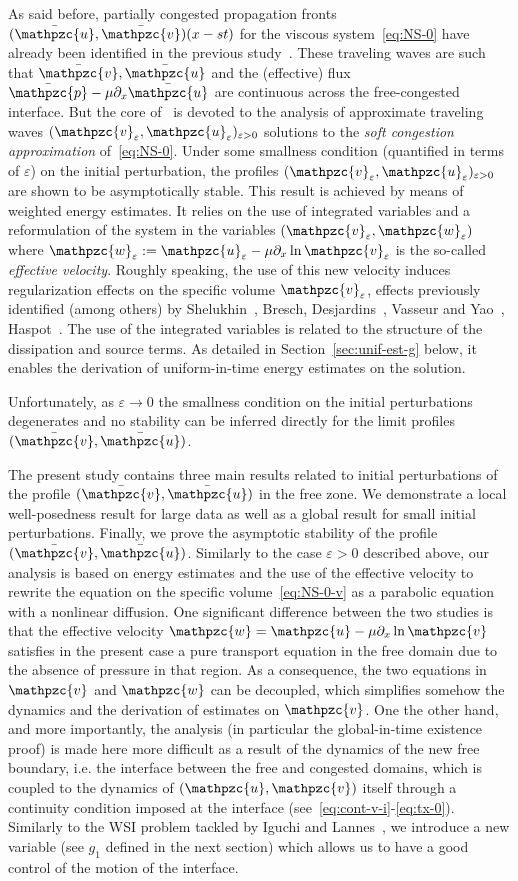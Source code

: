 \documentclass[AHL,Unicode,longabstracts,published]{cedram}
\newcommand{\ep}{\varepsilon}
\newcommand{\p}{\partial}
\newcommand{\bv}{\bar{\mathpzc{v}}}
\newcommand{\bu}{\bar{\mathpzc{u}}}
\newcommand{\bp}{\bar{\mathpzc{p}}}
\newcommand{\tv}{\mathpzc{v}}
\newcommand{\tu}{\mathpzc{u}}
\newcommand{\tw}{\mathpzc{w}}
\begin{document}
As said before, partially congested propagation fronts $(\bu, \bv)(x-st)$ for the viscous system~\eqref{eq:NS-0} have already been identified in the previous study~\cite{DP}. These traveling waves are such that $\bv, \bu$ and the (effective) flux $\bp-\mu\partial_x \bu$ are continuous across the free-congested interface. But the core of~\cite{DP} is devoted to the analysis of approximate traveling waves $(\tv_\ep,\tu_\ep)_{\ep> 0}$ solutions to the \emph{soft congestion approximation} of~\eqref{eq:NS-0}. Under some smallness condition (quantified in terms of $\ep$) on the initial perturbation, the profiles $(\tv_\ep,\tu_\ep)_{\ep> 0}$ are shown to be asymptotically stable. This result is achieved by means of weighted energy estimates. It relies on the use of integrated variables and a reformulation of the system in the variables $(\tv_\ep,\tw_\ep)$ where $\tw_\ep:= \tu_\ep -\mu \partial_x \ln\tv_\ep$ is the so-called \emph{effective velocity}. Roughly speaking, the use of this new velocity induces regularization effects on the specific volume $\tv_\ep$, effects previously identified (among others) by Shelukhin~\cite{shelukhin1984}, Bresch, Desjardins~\cite{bresch2006}, Vasseur and Yao~\cite{vasseur2016}, Haspot~\cite{haspot2018}. The use of the integrated variables is related to the structure of the dissipation and source terms. As detailed in Section~\ref{sec:unif-est-g} below, it enables the derivation of uniform-in-time energy estimates on the solution.


Unfortunately, as $\ep \to 0$ the smallness condition on the initial perturbations degenerates and no stability can be inferred directly for the limit profiles $(\bv,\bu)$.



The present study contains three main results related to initial perturbations of the profile $(\bv,\bu)$ in the free zone. We demonstrate a local well-posedness result for large data as well as a global result for small initial perturbations. Finally, we prove the asymptotic stability of the profile $(\bv,\bu)$. Similarly to the case $\ep > 0$ described above, our analysis is based on energy estimates and the use of the effective velocity to rewrite the equation on the specific volume~\eqref{eq:NS-0-v} as a parabolic equation with a nonlinear diffusion. One significant difference between the two studies is that the effective velocity $\tw=\tu - \mu \p_x \ln \tv$ satisfies in the present case a pure transport equation in the free domain due to the absence of pressure in that region. As a consequence, the two equations in $\tv$ and $\tw$ can be decoupled, which simplifies somehow the dynamics and the derivation of estimates on $\tv$. One the other hand, and more importantly, the analysis (in particular the global-in-time existence proof) is made here more difficult as a result of the dynamics of the new free boundary, i.e. the interface between the free and congested domains, which is coupled to the dynamics of $(\tu, \tv)$ itself through a continuity condition imposed at the interface (see~\eqref{eq:cont-v-i}-\eqref{eq:tx-0}). Similarly to the WSI problem tackled by Iguchi and Lannes~\cite{iguchi2019}, we introduce a new variable (see $g_1$ defined in the next section) which allows us to have a good control of the motion of the interface.
\end{document}
